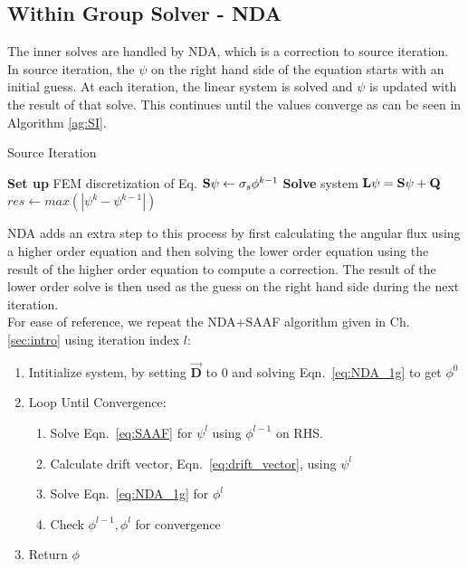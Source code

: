 \subsection{Within Group Solver - NDA}
The inner solves are handled by NDA, which is a correction to source iteration. In source iteration, the $\psi$ on the right hand side of the equation starts with an initial guess. At each iteration, the linear system is solved and $\psi$ is updated with the result of that solve. This continues until the values converge as can be seen in Algorithm \ref{ag:SI}.
\begin{algorithm}
\caption{Source Iteration}
\begin{algorithmic}
 
    \State \textbf{Set up} FEM discretization of Eq.
    \State ${\bf S} \psi \gets \sigma_s \phi^{k-1}$ 
    \State \textbf{Solve} system $\textbf{L}\psi= {\bf S}\psi + {\bf Q}$
    \State $res \gets max(|\psi^{k} - \psi^{k-1}|)$
\EndWhile
\end{algorithmic}
\label{ag:SI}
\end{algorithm}


NDA adds an extra step to this process by first calculating the angular flux using a higher order equation and then solving the lower order equation using the result of the higher order equation to compute a correction. The result of the lower order solve is then used as the guess on the right hand side during the next iteration. \\
For ease of reference, we repeat the NDA+SAAF algorithm given in Ch. \ref{sec:intro} using iteration index $l$: 

\begin{enumerate}
    \item Intitialize system, by setting $\vec{\textbf{D}}$ to 0 and solving Eqn.~\eqref{eq:NDA_1g} to get $\phi^0$ 
    \item Loop Until Convergence:
        \begin{enumerate}
            \item Solve Eqn.~\eqref{eq:SAAF} for $\psi^l$ using $\phi^{l-1}$ on RHS.
            \item Calculate drift vector, Eqn.~\eqref{eq:drift_vector}, using $\psi^l$
            \item Solve Eqn.~\eqref{eq:NDA_1g} for $\phi^l$
            \item Check $\phi^{l-1}, \phi^l$ for convergence
        \end{enumerate}
    \item Return $\phi$
\end{enumerate}

